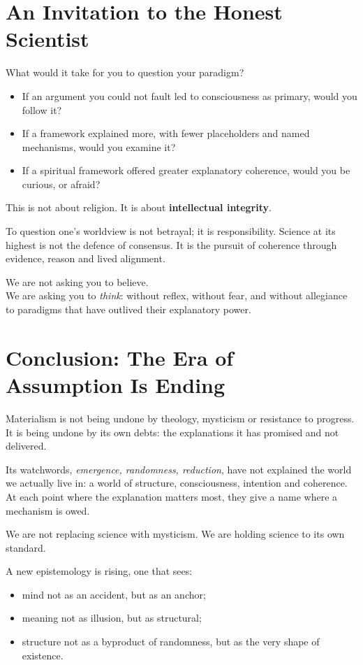 \documentclass[11pt,a4paper]{article}
\begin{document}
\section{An Invitation to the Honest Scientist}
\label{sec:invitation}

What would it take for you to question your paradigm?
\begin{itemize}
  \item If an argument you could not fault led to consciousness as primary, would you follow it?
  \item If a framework explained more, with fewer placeholders and named mechanisms, would you examine it?
  \item If a spiritual framework offered greater explanatory coherence, would you be curious, or afraid?
\end{itemize}

This is not about religion. It is about \textbf{intellectual integrity}.

To question one's worldview is not betrayal; it is responsibility. Science at its highest is not the defence of consensus. It is the pursuit of coherence through evidence, reason and lived alignment.

We are not asking you to believe.\\
We are asking you to \textit{think}: without reflex, without fear, and without allegiance to paradigms that have outlived their explanatory power.

\section*{Conclusion: The Era of Assumption Is Ending}

Materialism is not being undone by theology, mysticism or resistance to progress. It is being undone by its own debts: the explanations it has promised and not delivered.

Its watchwords, \textit{emergence, randomness, reduction}, have not explained the world we actually live in: a world of structure, consciousness, intention and coherence. At each point where the explanation matters most, they give a name where a mechanism is owed.

We are not replacing science with mysticism. We are holding science to its own standard.

A new epistemology is rising, one that sees:
\begin{itemize}
  \item mind not as an accident, but as an anchor;
  \item meaning not as illusion, but as structural;
  \item structure not as a byproduct of randomness, but as the very shape of existence.
\end{itemize}
\end{document}
